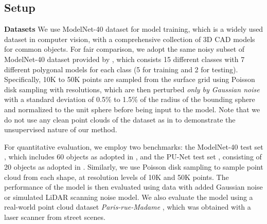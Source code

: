 

\subsection{Setup}
\label{sec:experiment:setup}

\textbf{Datasets}\quad
We use ModelNet-40 dataset\cite{wu2015modelnet} for model training, which is a widely used dataset in computer vision, with a comprehensive collection of 3D CAD models for common objects. For fair comparison, we adopt the same noisy subset of ModelNet-40 dataset provided by \cite{hermosilla2019TotalDenoising}, which consists 15 different classes with 7 different polygonal models for each class (5 for training and 2 for testing).  Specifically, 10K to 50K points are sampled from the surface grid using Poisson disk sampling with resolutions, which are then perturbed \emph{only by Gaussian noise} with a standard deviation of 0.5\%{} to 1.5\%{} of the radius of the bounding sphere and normalized to the unit sphere before being input to the model. Note that we do not use any clean point clouds of the dataset as in \cite{hermosilla2019TotalDenoising} to demonstrate the unsupervised nature of our method. 

For quantitative evaluation, we employ two benchmarks: the ModelNet-40 test set \cite{wu2015modelnet}, which includes 60 objects as adopted in \cite{luo2020DMR}, and the PU-Net test set \cite{yu2018PUNet}, consisting of 20 objects as adopted in \cite{luo_score-based_2021}. Similarly, we use Poisson disk sampling to sample point cloud from each shape, at resolution levels of 10K and 50K points. The performance of the model is then evaluated using data with added Gaussian noise or simulated LiDAR scanning noise model. We also evaluate the model using a real-world point cloud dataset \textit{Paris-rue-Madame}  \cite{serna2014paris}, which was obtained with a laser scanner from street scenes. 


